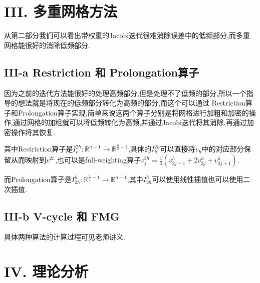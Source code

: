 \documentclass[twoside,a4paper]{article}
\begin{document}
\newpage
\section*{III. 多重网格方法}
\hspace{0.8em}
从第二部分我们可以看出带权重的Jacobi迭代很难消除误差中的低频部分,而多重网格能很好的消除低频部分.
\subsection*{III-a Restriction 和 Prolongation算子}
\hspace{0.8em}
因为之前的迭代方法能很好的处理高频部分,但是处理不了低频的部分,所以一个指导的想法就是将现在的低频部分转化为高频的部分,而这个可以通过
Restriction算子和Prolongation算子实现,简单来说这两个算子分别是将网格进行加粗和加密的操作,通过网格的加粗就可以将低频转化为高频,并通过Jacobi迭代将其消除,再通过加密操作将其恢复.

其中Restriction算子是$I^{2h}_h:\mathbb{R}^{n-1}\rightarrow\mathbb{R}^{\frac{n}{2}-1}$,具体的$I_{h}^{2h}$可以直接将$v_h$中的对应部分保留从而映射到$v^{2h}$,也可以是full-weighting算子$v_j^{2h}=\frac{1}{4}(v_{2j-1}^h+2v_{2j}^h+v_{2j+1}^h)$.

而Prolongation算子是$I^{h}_{2h}:\mathbb{R}^{\frac{n}{2}-1}\rightarrow\mathbb{R}^{n-1}$,其中$I_{2h}^{h}$可以使用线性插值也可以使用二次插值.

\subsection*{III-b V-cycle 和 FMG}
\hspace{0.9em}
具体两种算法的计算过程可见老师讲义.

\section*{IV. 理论分析}
\end{document}
